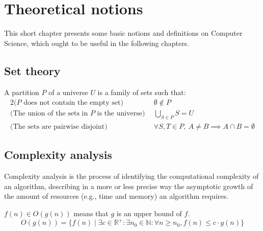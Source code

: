 \chapter{Theoretical notions} \label{theoretical-notions}
This short chapter presents some basic notions and definitions on Computer Science, which ought to be useful in the following chapters.
\section{Set theory} \label{set-theory}
\begin{definition}[Partition]
    A partition $P$ of a universe $U$ is a family of sets such that:
    \begin{alignat*}{2}
        \text{($P$ does not contain the empty set)}          ~~& \emptyset \not \in P\\
        \text{(The union of the sets in $P$ is the universe)}~~& \bigcup_{S \in P}{S} = U\\
        \text{(The sets are pairwise disjoint)}              ~~& \forall S, T \in P,~A \neq B \implies A \cap B = \emptyset
    \end{alignat*}
\end{definition}
\section{Complexity analysis} \label{complexity-analysis}
Complexity analysis is the process of identifying the computational complexity of an algorithm, describing in a more or less precise way the asymptotic growth of the amount of resources (e.g., time and memory) an algorithm requires.
\begin{definition} $f(n) \in O(g(n))$ means that $g$ is an upper bound of $f$.
    \begin{equation*}
        O(g(n))=\{f(n) \mid \exists c \in \mathbb{R}^+ \colon \exists n_0 \in \mathbb{N} \colon \forall n \geq n_0, f(n) \leq c\cdot g(n)\}
    \end{equation*}
\end{definition}
